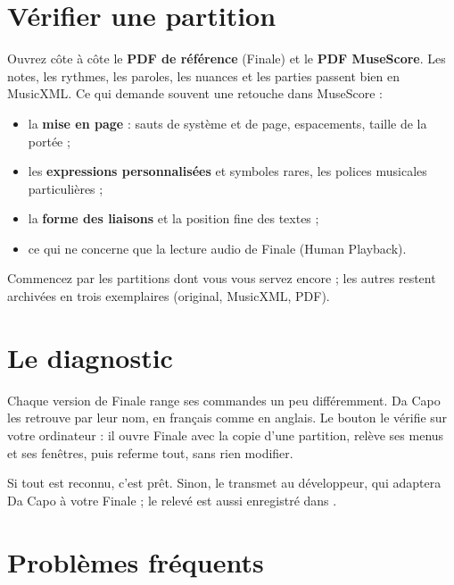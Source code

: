 \section{Vérifier une partition}

Ouvrez côte à côte le \textbf{PDF de référence} (Finale) et le \textbf{PDF MuseScore}. Les notes,
les rythmes, les paroles, les nuances et les parties passent bien en MusicXML. Ce qui demande
souvent une retouche dans MuseScore :
\begin{itemize}
\item la \textbf{mise en page} : sauts de système et de page, espacements, taille de la portée ;
\item les \textbf{expressions personnalisées} et symboles rares, les polices musicales particulières ;
\item la \textbf{forme des liaisons} et la position fine des textes ;
\item ce qui ne concerne que la lecture audio de Finale (Human Playback).
\end{itemize}
Commencez par les partitions dont vous vous servez encore ; les autres restent archivées en trois
exemplaires (original, MusicXML, PDF).


\section{Le diagnostic}\label{sec:diagnostic}

Chaque version de Finale range ses commandes un peu différemment. Da Capo les retrouve par leur nom,
en français comme en anglais. Le bouton  le vérifie sur votre ordinateur : il
ouvre Finale avec la copie d'une partition, relève ses menus et ses fenêtres, puis referme tout,
sans rien modifier.


Si tout est reconnu, c'est prêt. Sinon,  le transmet au développeur, qui
adaptera Da Capo à votre Finale ; le relevé est aussi enregistré dans .

\section{Problèmes fréquents}

